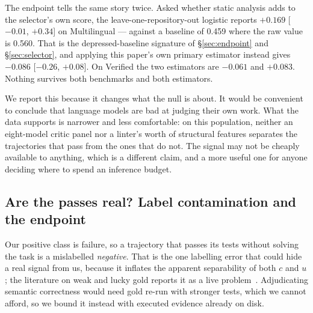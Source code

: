 \documentclass[11pt]{article}
\begin{document}
The endpoint tells the same story twice. Asked whether static analysis adds to the selector's own score, the leave-one-repository-out logistic reports $+0.169$ [$-0.01$, $+0.34$] on Multilingual --- against a baseline of 0.459 where the raw value is 0.560. That is the depressed-baseline signature of \S\ref{sec:endpoint} and \S\ref{sec:selector}, and applying this paper's own primary estimator instead gives $\mathbf{-0.086}$ [$-0.26$, $+0.08$]. On Verified the two estimators are $-0.061$ and $+0.083$. Nothing survives both benchmarks and both estimators.

We report this because it changes what the null is about. It would be convenient to conclude that language models are bad at judging their own work. What the data supports is narrower and less comfortable: on this population, neither an eight-model critic panel nor a linter's worth of structural features separates the trajectories that pass from the ones that do not. The signal may not be cheaply available to anything, which is a different claim, and a more useful one for anyone deciding where to spend an inference budget.

\subsection{Are the passes real? Label contamination and the endpoint}\label{sec:luckypass}
Our positive class is failure, so a trajectory that passes its tests without solving the task is a mislabelled \emph{negative}. That is the one labelling error that could hide a real signal from us, because it inflates the apparent separability of both $c$ and $u$; the literature on weak and lucky gold reports it as a live problem~\citep{wang2025solved,agentlens2026}. Adjudicating semantic correctness would need gold re-run with stronger tests, which we cannot afford, so we bound it instead with executed evidence already on disk.
\end{document}
